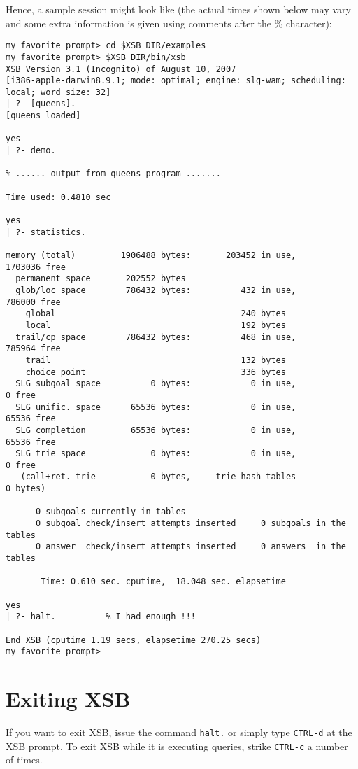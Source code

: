 Hence, a sample session might look like
(the actual times shown below may vary and some extra information is given
using comments after the \% character):

{\footnotesize
 \begin{verbatim}
my_favorite_prompt> cd $XSB_DIR/examples
my_favorite_prompt> $XSB_DIR/bin/xsb
XSB Version 3.1 (Incognito) of August 10, 2007
[i386-apple-darwin8.9.1; mode: optimal; engine: slg-wam; scheduling: local; word size: 32]
| ?- [queens].
[queens loaded]

yes
| ?- demo.

% ...... output from queens program .......

Time used: 0.4810 sec

yes
| ?- statistics.

memory (total)         1906488 bytes:       203452 in use,      1703036 free
  permanent space       202552 bytes
  glob/loc space        786432 bytes:          432 in use,       786000 free
    global                                     240 bytes
    local                                      192 bytes
  trail/cp space        786432 bytes:          468 in use,       785964 free
    trail                                      132 bytes
    choice point                               336 bytes
  SLG subgoal space          0 bytes:            0 in use,            0 free
  SLG unific. space      65536 bytes:            0 in use,        65536 free
  SLG completion         65536 bytes:            0 in use,        65536 free
  SLG trie space             0 bytes:            0 in use,            0 free
   (call+ret. trie           0 bytes,     trie hash tables            0 bytes)

      0 subgoals currently in tables
      0 subgoal check/insert attempts inserted     0 subgoals in the tables
      0 answer  check/insert attempts inserted     0 answers  in the tables

       Time: 0.610 sec. cputime,  18.048 sec. elapsetime

yes
| ?- halt.          % I had enough !!!

End XSB (cputime 1.19 secs, elapsetime 270.25 secs)
my_favorite_prompt>
 \end{verbatim}
}


\section{Exiting XSB}

If you want to exit XSB, issue the command \verb'halt.' or
simply type \verb'CTRL-d' at the XSB prompt. To exit XSB while it is
executing queries, strike \verb'CTRL-c' a number of times.


